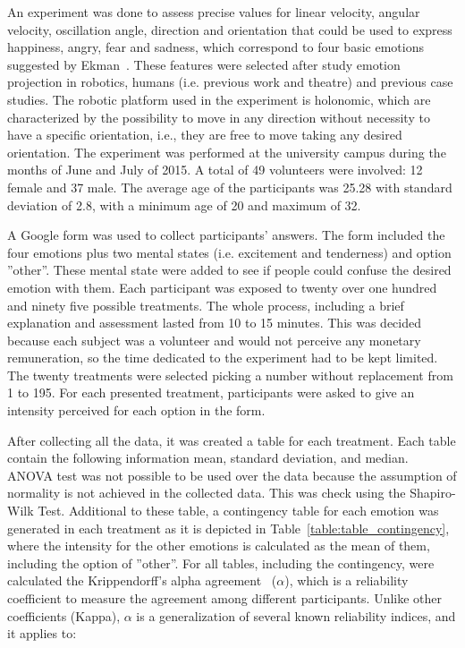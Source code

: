 An experiment was done to assess precise values for linear velocity, angular velocity, oscillation angle, direction and orientation that could be used to express happiness, angry, fear and sadness, which correspond to four basic emotions suggested by Ekman~\cite{Ekman2001}. These features were selected after study emotion projection in robotics, humans (i.e. previous work and theatre) and previous case studies. The robotic platform used in the experiment is holonomic, which are characterized by the possibility to move in any direction without necessity to have a specific orientation, i.e., they are free to move taking any desired orientation. The experiment was performed at the university campus during the months of June and July of 2015.  A total of 49 volunteers were involved: 12 female and 37 male. The average age of the participants was 25.28 with standard deviation of 2.8, with a minimum age of 20 and maximum of 32. 

A Google form was used to collect participants' answers. The form included the four emotions plus two mental states (i.e. excitement and tenderness) and option ''other''. These mental state were added to see if people could confuse the desired emotion with them. Each participant was exposed to twenty over one hundred and ninety five possible treatments. The whole process, including a brief explanation and assessment lasted  from 10 to 15 minutes. This was decided because each subject was a volunteer and would not perceive any monetary remuneration, so the time dedicated to the experiment had to be kept limited. The twenty treatments were selected picking a number without replacement from 1 to 195. For each presented treatment, participants were asked to give an intensity perceived for each option in the form. 

After collecting all the data, it was created a table for each treatment. Each table contain the following information mean, standard deviation, and median. ANOVA test was not possible to be used over the data because the assumption of normality is not achieved in the collected data. This was check using the Shapiro-Wilk Test.
Additional to these table, a contingency table for each emotion was generated in each treatment as it is depicted in  Table~\ref{table:table_contingency},  where the intensity for the other emotions is calculated as the mean of them, including the option of ''other''. For all tables, including the contingency, were calculated the Krippendorff's alpha agreement~\cite{Krippendorff2007} ($\alpha$), which is a reliability coefficient to measure the agreement among different participants. Unlike other coefficients (Kappa), $\alpha$ is a generalization of several known reliability indices, and it applies to:

